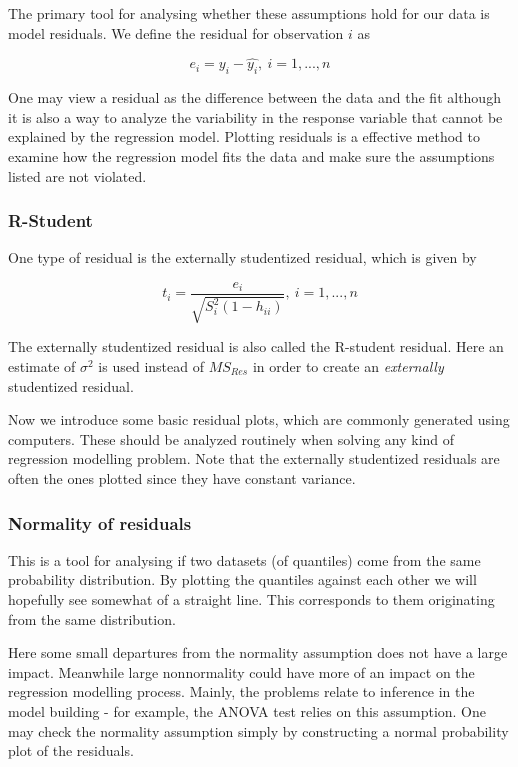 \documentclass[11pt]{article}
\begin{document}
The primary tool for analysing whether these assumptions hold for our data is model residuals. 
We define the residual for observation \(i\) as

\[
   e_i = y_i - \hat{y_i}, \ i = 1, ... , n
   \]

One may view a residual as the difference between the data and the fit although it is also a way to analyze 
the variability in the response variable that cannot be explained by the regression model. Plotting residuals
is a effective method to examine how the regression model fits the data and make sure the assumptions listed 
are not violated.

\subsubsection{R-Student}
\label{sec:orgab8ee83}

One type of residual is the externally studentized residual, which is given by

\[
    t_i = \frac{e_i}{\sqrt{S^2_{i}(1 - h_{ii})}}, \ i = 1, ..., n
    \]

The externally studentized residual is also called the R-student residual. 
Here an estimate of \(\sigma^2\) is used instead of \(MS_{Res}\) in order to create an 
\textit{externally} studentized residual.

Now we introduce some basic residual plots, which are commonly generated using computers. These
should be analyzed routinely when solving any kind of regression modelling problem. Note that the
externally studentized residuals are often the ones plotted since they have constant variance.

\subsubsection{Normality of residuals}
\label{sec:org2b3d98f}

This is a tool for analysing if two datasets (of quantiles) come from the same probability distribution. 
By plotting the quantiles against each other we will hopefully see somewhat of a straight line. This 
corresponds to them originating from the same distribution. 

Here some small departures from the normality assumption does not have a large impact. Meanwhile 
large nonnormality could have more of an impact on the regression modelling process. Mainly, the problems 
relate to inference in the model building - for example, the ANOVA test relies on this assumption. One
may check the normality assumption simply by constructing a normal probability plot of the residuals. 
\end{document}

